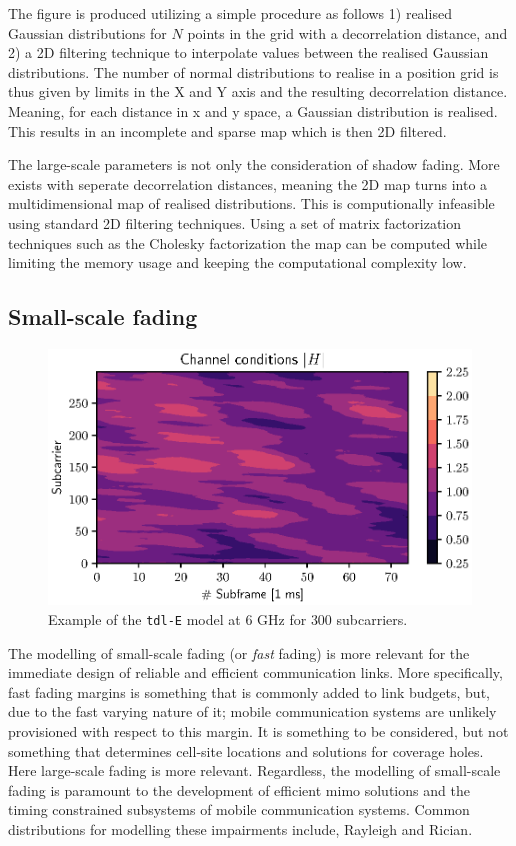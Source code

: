 The figure is produced utilizing a simple procedure as follows 1) realised Gaussian distributions for $N$ points in the grid with a decorrelation distance, and 2) a 2D filtering technique to interpolate values between the realised Gaussian distributions. The number of normal distributions to realise in a position grid is thus given by limits in the X and Y axis and the resulting decorrelation distance. Meaning, for each distance in x and y space, a Gaussian distribution is realised. This results in an incomplete and sparse map which is then 2D filtered.

The large-scale parameters is not only the consideration of shadow fading. More exists with seperate decorrelation distances, meaning the 2D map turns into a multidimensional map of realised distributions. This is computionally infeasible using standard 2D filtering techniques. Using a set of matrix factorization techniques such as the Cholesky factorization the map can be computed while limiting the memory usage and keeping the computational complexity low.


\subsection{Small-scale fading}
\begin{figure}
    \centering
    \includegraphics{chapters/part_pathloss/figures/fast_fading_example.eps}
    \caption{Example of the \texttt{\gls{tdl}-E} model at $6$ GHz for $300$ subcarriers.} 
    \label{fig:fast_fading_example}
\end{figure}


The modelling of small-scale fading (or \emph{fast} fading) is more relevant for the immediate design of reliable and efficient communication links. More specifically, fast fading margins is something that is commonly added to link budgets, but, due to the fast varying nature of it; mobile communication systems are unlikely provisioned with respect to this margin. It is something to be considered, but not something that determines cell-site locations and solutions for coverage holes. Here large-scale fading is more relevant. Regardless, the modelling of small-scale fading is paramount to the development of efficient \gls{mimo} solutions and the timing constrained subsystems of mobile communication systems. Common distributions for modelling these impairments include, Rayleigh and Rician.

